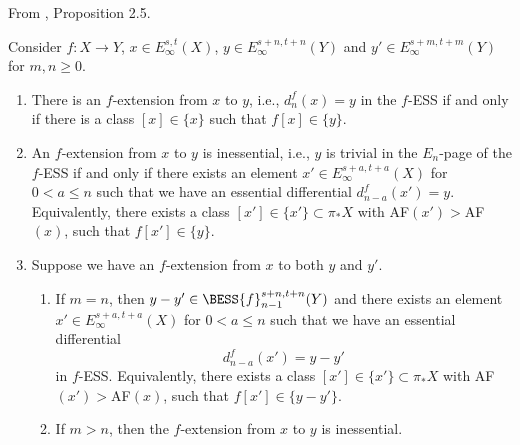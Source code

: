 \begin{proposition}
\label{paper:2.5}
From \cite{LWX126}, Proposition 2.5.\par
\label{prop:8154e6f1}
Consider $f: X\to Y$, $x\in E_\infty^{s,t}(X)$, $y\in E_\infty^{s+n,t+n}(Y)$ and $y'\in E_\infty^{s+m,t+m}(Y)$ for $m,n\ge 0$.
\begin{enumerate}
    \item There is an $f$-extension from $x$ to $y$, i.e., $d_n^{f}(x)=y$ in the $f$-ESS if and only if there is a class $[x]\in \{x\}$ such that $f[x]\in \{y\}$.
    \item An $f$-extension from $x$ to $y$ is inessential, i.e., $y$ is trivial in the $E_n$-page of the $f$-ESS if and only if there exists an element $x'\in E_\infty^{s+a,t+a}(X)$ for $0<a\le n$ such that we have an essential differential $d_{n-a}^{f}(x')=y$. Equivalently, there exists a class $[x'] \in \{x'\} \subset \pi_*X$ with AF$(x')>$AF$(x)$, such that $f[x'] \in \{y\}$.
    
    \item Suppose we have an $f$-extension from $x$ to both $y$ and $y'$.
    \begin{enumerate}
        \item If $m=n$, then $y-y'\in \BESS{f}^{s+n,t+n}_{n-1}(Y)$ and there exists an element $x'\in E_\infty^{s+a,t+a}(X)$ for $0<a\le n$ such that we have an essential differential 
        $$d_{n-a}^{f}(x') = y-y'$$
        in $f$-ESS. Equivalently, there exists a class $[x'] \in \{x'\} \subset \pi_*X$ with AF$(x')>$AF$(x)$, such that $f[x'] \in \{y-y'\}$. 
        \item If $m>n$, then the $f$-extension from $x$ to $y$ is inessential.
     \end{enumerate}
\end{enumerate}




\end{proposition}

